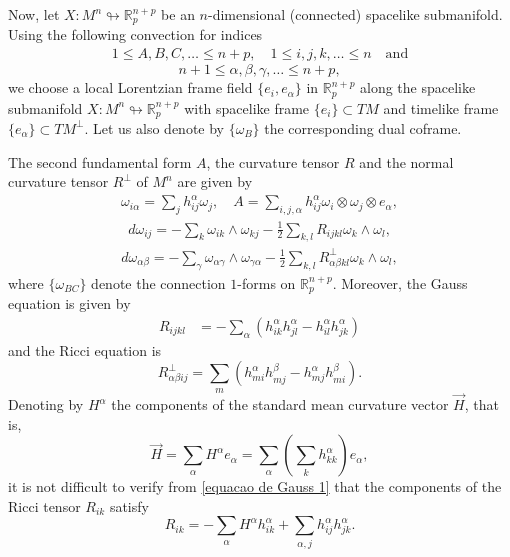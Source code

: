 \documentclass[leqno,11pt]{amsart}
\theoremstyle{plain}
\theoremstyle{definition}
\numberwithin{equation}{section}
\begin{document}
Now, let $X:M^{n}\looparrowright\mathbb{R}^{n+p}_{p}$ be an $n$-dimensional (connected) spacelike submanifold. Using the following convection for indices
\begin{eqnarray*}
1\leq A,B,C,\ldots\leq n+p,\quad 1\leq i,j,k,\ldots\leq n\quad\mbox{and} 
\end{eqnarray*}
$$
n+1\leq \alpha,\beta,\gamma,\ldots\leq n+p,
$$
we choose a local Lorentzian frame field $\{e_i,e_\alpha\}$ in $\mathbb{R}_p^{n+p}$ along the spacelike submanifold $X:M^{n}\looparrowright\mathbb{R}^{n+p}_{p}$ with spacelike frame $\{e_i\}\subset TM$ and timelike frame $\{e_\alpha\}\subset TM^\perp$. Let us also denote by $\{\omega_{B}\}$ the corresponding dual coframe.

The second fundamental form $A$, the curvature tensor $R$ and the normal curvature tensor $R^\perp$ of $M^{n}$ are given by
\begin{eqnarray*}
\omega_{i\alpha}=\sum_{j}h_{ij}^{\alpha}\omega_{j},\quad A=\sum_{i,j,\alpha}h_{ij}^{\alpha}\omega_{i}\otimes\omega_{j}\otimes e_{\alpha},
\end{eqnarray*}
\begin{eqnarray*}
d\omega_{ij}=-\sum_{k}\omega_{ik}\wedge \omega_{kj}-\frac{1}{2}\sum_{k,l}R_{ijkl}\omega_{k}\wedge \omega_{l},
\end{eqnarray*}
\begin{eqnarray*}
d\omega_{\alpha\beta}=-\sum_{\gamma}\omega_{\alpha\gamma}\wedge \omega_{\gamma\alpha}-\frac{1}{2}\sum_{k,l}R_{\alpha\beta kl}^{\perp}\omega_{k}\wedge\omega_{l},
\end{eqnarray*}
where $\{\omega_{BC}\}$ denote the connection $1$-forms on $\mathbb{R}_p^{n+p}$. Moreover, the Gauss equation is given by
\begin{align}\label{equacao de Gauss 1}
R_{ijkl}&=-\sum_{\alpha}(h_{ik}^{\alpha}h_{jl}^{\alpha}-h_{il}^{\alpha}h_{jk}^{\alpha})
\end{align}
and the Ricci equation is
\begin{equation}\label{equacao de Ricci}
R^\perp_{\alpha\beta ij}=\sum_{m}(h^{\alpha}_{mi}h^{\beta}_{mj}-h^{\alpha}_{mj}h^{\beta}_{mi}).
\end{equation}
Denoting by $H^\alpha$ the components of the standard mean curvature vector $\vec{H}$, that
is,
$$
\vec{H} = \sum_\alpha H^\alpha {e}_\alpha = \sum_\alpha \left( \sum_k h^\alpha_{kk} \right) {e}_\alpha,
$$
it is not difficult to verify from \eqref{equacao de Gauss 1} that the components of the Ricci tensor $R_{ik}$ 
satisfy
\begin{equation}\label{tensor Ricc}
R_{ik} = -\sum_\alpha H^\alpha h^\alpha_{ik} + \sum_{\alpha,j} h^\alpha_{ij} h^\alpha_{jk}.
\end{equation}
\end{document}
